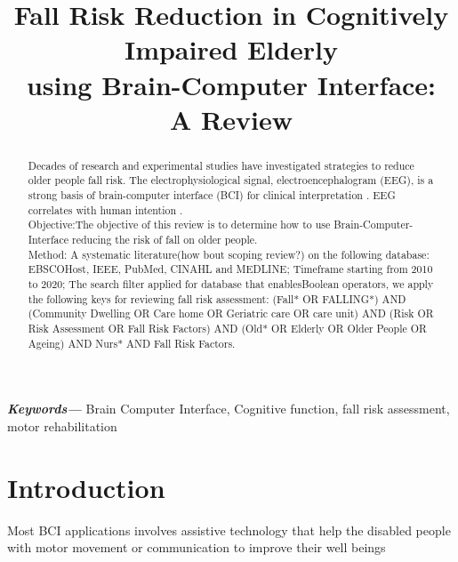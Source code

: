 \documentclass[conference,compsoc]{IEEEtran}
\providecommand{\keywords}[1]
{
  \small	
  \textbf{\textit{Keywords---}} #1
}
\begin{document}
\title{Fall Risk Reduction in Cognitively Impaired Elderly \\using Brain-Computer Interface: \\A Review}


\author{
}


\maketitle

\begin{abstract}
Decades of research and experimental studies have investigated strategies to reduce older people fall risk. The electrophysiological signal, electroencephalogram
(EEG),  is a strong basis of brain-computer interface (BCI) for clinical interpretation \cite{Panoulas_2010,Mane_2020}. EEG correlates with human intention \cite{Panoulas_2010}.\\
Objective:The objective of this review is to determine how to use Brain-Computer-Interface 
reducing the risk of fall on older people.\\
Method: A systematic literature(how bout scoping review?) on the following database: EBSCOHost, IEEE, PubMed, CINAHL and MEDLINE; 
Timeframe starting from 2010 to 2020;
The search filter applied for database that enablesBoolean  operators, we apply the following keys for reviewing fall risk assessment: (Fall* 
	OR FALLING*)
AND (Community Dwelling
	OR Care home
	OR Geriatric care OR care unit)
AND (Risk
	OR Risk Assessment
	OR Fall Risk Factors)
AND (Old*
	OR Elderly
	OR Older People
	OR Ageing)
AND Nurs*
AND Fall Risk Factors.
\end{abstract}

\keywords{Brain Computer Interface, Cognitive function, fall risk assessment, motor rehabilitation}

\IEEEpeerreviewmaketitle


\section{Introduction}
Most BCI applications involves assistive technology that help the disabled people with motor movement or communication to improve their well beings\cite{Kubler_2006}
\end{document}
